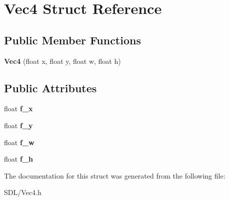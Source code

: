 \hypertarget{struct_vec4}{\section{Vec4 Struct Reference}
\label{struct_vec4}
}
\subsection*{Public Member Functions}
\begin{DoxyCompactItemize}
\item 
\hypertarget{struct_vec4_a56a99878706317ae99f33cb9d94fadb0}{{\bfseries Vec4} (float x, float y, float w, float h)}\label{struct_vec4_a56a99878706317ae99f33cb9d94fadb0}

\end{DoxyCompactItemize}
\subsection*{Public Attributes}
\begin{DoxyCompactItemize}
\item 
\hypertarget{struct_vec4_aed4f75eeba3a5e32acc0eebee70ac1a6}{float {\bfseries f\+\_\+x}}\label{struct_vec4_aed4f75eeba3a5e32acc0eebee70ac1a6}

\item 
\hypertarget{struct_vec4_a9e6802ebe62f86c85994901f764ac0fc}{float {\bfseries f\+\_\+y}}\label{struct_vec4_a9e6802ebe62f86c85994901f764ac0fc}

\item 
\hypertarget{struct_vec4_a14b4beebb11d0a0daf201fe8e225e739}{float {\bfseries f\+\_\+w}}\label{struct_vec4_a14b4beebb11d0a0daf201fe8e225e739}

\item 
\hypertarget{struct_vec4_a34749726e12bb1258b6f2941fa60b7ed}{float {\bfseries f\+\_\+h}}\label{struct_vec4_a34749726e12bb1258b6f2941fa60b7ed}

\end{DoxyCompactItemize}


The documentation for this struct was generated from the following file\+:\begin{DoxyCompactItemize}
\item 
S\+D\+L/Vec4.\+h\end{DoxyCompactItemize}
